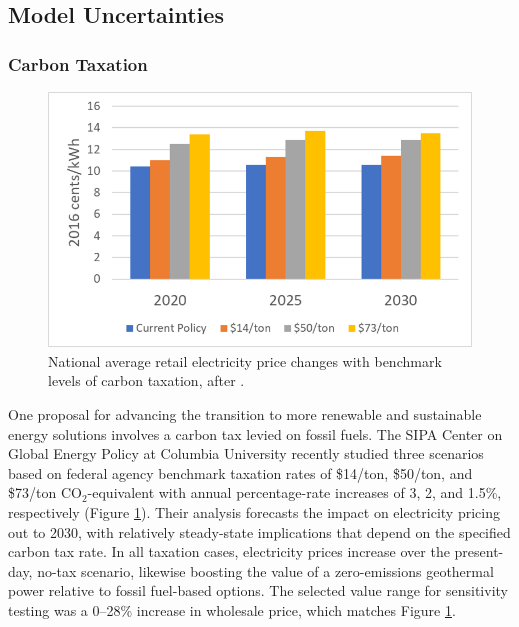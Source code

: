 \subsection{Model Uncertainties}\label{ch4:model_uncertainties}

\subsubsection{Carbon Taxation}\label{ch4:carbon_tax_uncertainty}

\begin{figure}
\centering
\includegraphics[scale=0.6]{templates/images/Figure-Carbon_Tax_Price_Impact.png}
\singlespacing
\caption[Carbon tax price impact]{National average retail electricity price changes with benchmark levels of carbon taxation, after \protect\citep[Figure\ 30]{larson_energy_2018}.}
\label{fig:carbon_tax_pricing}
\end{figure}
One proposal for advancing the transition to more renewable and sustainable energy solutions involves a carbon tax levied on fossil fuels. The SIPA Center on Global Energy Policy at Columbia University recently studied three %
scenarios based on federal agency benchmark taxation rates of \$14/ton, \$50/ton, and \$73/ton CO$_2$-equivalent with annual percentage-rate increases of 3, 2, and 1.5\%, respectively \citep{larson_energy_2018} (Figure \ref{fig:carbon_tax_pricing}). Their analysis forecasts the impact on electricity pricing out to 2030, with relatively steady-state implications that depend on the specified carbon tax rate. In all taxation cases, electricity prices increase over the present-day, no-tax scenario, likewise boosting the value of a zero-emissions geothermal power relative to fossil fuel-based options. The selected value range for sensitivity testing was a 0--28\% increase in wholesale price, which matches Figure \ref{fig:carbon_tax_pricing}.

